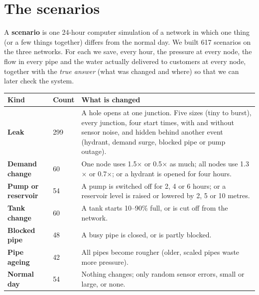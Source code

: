 \documentclass[11pt,a4paper]{article}
\begin{document}
\section{The scenarios}
A \textbf{scenario} is one 24-hour computer simulation of a network in which one thing (or a few things together) differs from the normal day. We built 617 scenarios on the three networks. For each we save, every hour, the pressure at every node, the flow in every pipe and the water actually delivered to customers at every node, together with the \emph{true answer} (what was changed and where) so that we can later check the system.
\begin{center}\small\begin{tabularx}{\linewidth}{@{}>{\bfseries}p{2.6cm}p{1.2cm}Y@{}}\toprule
Kind & Count & What is changed \\\midrule
Leak & 299 & A hole opens at one junction. Five sizes (tiny to burst), every junction, four start times, with and without sensor noise, and hidden behind another event (hydrant, demand surge, blocked pipe or pump outage). \\
Demand change & 60 & One node uses 1.5$\times$ or 0.5$\times$ as much; all nodes use 1.3$\times$ or 0.7$\times$; or a hydrant is opened for four hours. \\
Pump or reservoir & 54 & A pump is switched off for 2, 4 or 6 hours; or a reservoir level is raised or lowered by 2, 5 or 10 metres. \\
Tank change & 60 & A tank starts 10--90\% full, or is cut off from the network. \\
Blocked pipe & 48 & A busy pipe is closed, or is partly blocked. \\
Pipe ageing & 42 & All pipes become rougher (older, scaled pipes waste more pressure). \\
Normal day & 54 & Nothing changes; only random sensor errors, small or large, or none. \\\bottomrule\end{tabularx}\end{center}
\end{document}

